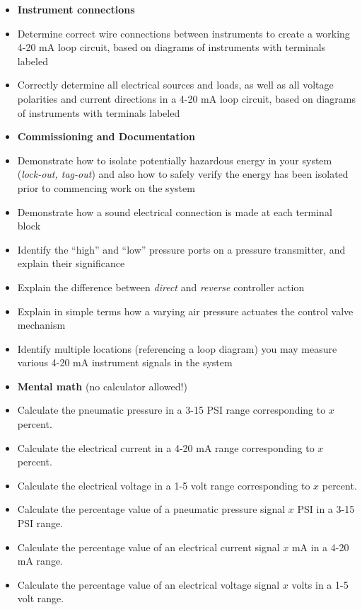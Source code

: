 \vskip 10pt

\begin{itemize}
\item{} {\bf Instrument connections}
\item{} Determine correct wire connections between instruments to create a working 4-20 mA loop circuit, based on diagrams of instruments with terminals labeled
\item{} Correctly determine all electrical sources and loads, as well as all voltage polarities and current directions in a 4-20 mA loop circuit, based on diagrams of instruments with terminals labeled
\end{itemize}

\filbreak

\begin{itemize}
\item{} {\bf Commissioning and Documentation}
\item{} Demonstrate how to isolate potentially hazardous energy in your system ({\it lock-out, tag-out}) and also how to safely verify the energy has been isolated prior to commencing work on the system
\item{} Demonstrate how a sound electrical connection is made at each terminal block
\item{} Identify the ``high'' and ``low'' pressure ports on a pressure transmitter, and explain their significance
\item{} Explain the difference between {\it direct} and {\it reverse} controller action
\item{} Explain in simple terms how a varying air pressure actuates the control valve mechanism
\item{} Identify multiple locations (referencing a loop diagram) you may measure various 4-20 mA instrument signals in the system
\end{itemize}

\filbreak


\begin{itemize}
\item{} {\bf Mental math} (no calculator allowed!)
\item{} Calculate the pneumatic pressure in a 3-15 PSI range corresponding to $x$ percent.
\item{} Calculate the electrical current in a 4-20 mA range corresponding to $x$ percent.
\item{} Calculate the electrical voltage in a 1-5 volt range corresponding to $x$ percent.
\item{} Calculate the percentage value of a pneumatic pressure signal $x$ PSI in a 3-15 PSI range.
\item{} Calculate the percentage value of an electrical current signal $x$ mA in a 4-20 mA range.
\item{} Calculate the percentage value of an electrical voltage signal $x$ volts in a 1-5 volt range.
\end{itemize}

